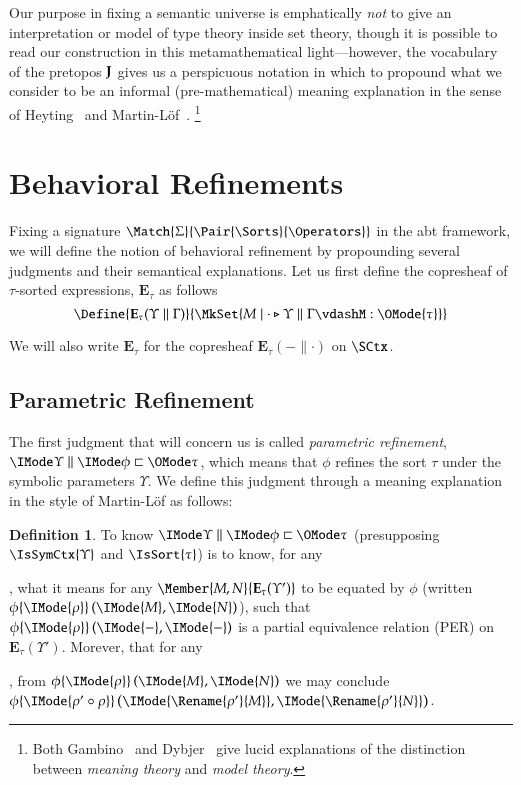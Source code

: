 \documentclass[11pt]{article}
\theoremstyle{definition}
\newtheorem{definition}[thm]{Definition}
\theoremstyle{notation}
\theoremstyle{remark}
\numberwithin{equation}{section}
\newcommand\IsAbtUnmoded[5]{
  #1\triangleright%
  #2\parallel%
  #3\vdash%
  #4:\OMode{#5}%
}
\newcommand\Exprs{\mathbf{E}}
\begin{document}
Our purpose in fixing a semantic universe is emphatically \emph{not} to give an
interpretation or model of type theory inside set theory, though it is possible
to read our construction in this metamathematical light---however, the
vocabulary of the pretopos $\mathbf{J}$ gives us a perspicuous notation in which to
propound what we consider to be an informal (pre-mathematical) meaning
explanation in the sense of Heyting~\cite{heyting:1956} and
Martin-L\"of~\cite{martin-lof:1979}.
\footnote{
  Both Gambino~\cite{gambino:2002} and Dybjer~\cite{dybjer:2012} give lucid
  explanations of the distinction between \emph{meaning theory} and \emph{model theory}.
}

\section{Behavioral Refinements}

Fixing a signature $\Match{\Sigma}{\Pair{\Sorts}{\Operators}}$ in the abt
framework, we will define the notion of behavioral refinement by propounding
several judgments and their semantical explanations. Let us first define the
copresheaf of $\tau$-sorted expressions, $\Exprs_\tau$ as follows
\[
  \Define{
    \Exprs_\tau(\Upsilon\parallel\Gamma)
  }{
    \MkSet{M \mid \IsAbtUnmoded{\cdot}{\Upsilon}{\Gamma}{M}{\tau}}
  }
\]

We will also write $\Exprs_\tau$ for the copresheaf $\Exprs_\tau(-\parallel\cdot)$ on $\SCtx$.

\subsection{Parametric Refinement}
\label{sec:parametric-refinement}

The first judgment that will concern us is called \emph{parametric refinement},
$\Refines{\Upsilon}{\phi}{\tau}$, which means that $\phi$ refines the sort
$\tau$ under the symbolic parameters $\Upsilon$. We define this judgment
through a meaning explanation in the style of Martin-L\"of as follows:

\newcommand\RefEquate[4]{#1\{\IMode{#2}\}\left(\IMode{#3},\IMode{#4}\right)}

\begin{definition}
  To know $\Refines{\Upsilon}{\phi}{\tau}$ (presupposing $\IsSymCtx{\Upsilon}$
  and $\IsSort{\tau}$) is to know, for any
, what it means for any $\Member{M,N}{\Exprs_\tau(\Upsilon')}$ to be equated by
  $\phi$ (written $\RefEquate{\phi}{\rho}{M}{N}$), such that
  $\RefEquate{\phi}{\rho}{-}{-}$ is a partial equivalence relation (PER) on
  $\Exprs_\tau(\Upsilon')$. Morever, that for any
,
  from $\RefEquate{\phi}{\rho}{M}{N}$ we may conclude
  $\RefEquate{\phi}{\rho'\circ\rho}{\Rename{\rho'}{M}}{\Rename{\rho'}{N}}$.
\end{definition}
\end{document}
